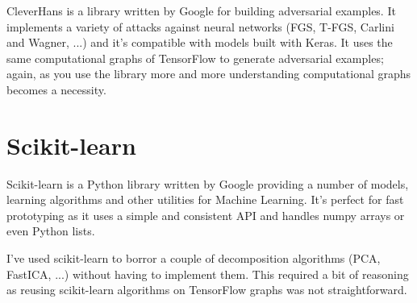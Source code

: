 CleverHans is a library written by Google for building adversarial examples. It
implements a variety of attacks against neural networks (FGS, T-FGS, Carlini and
Wagner, ...) and it's compatible with models built with Keras. It uses the same
computational graphs of TensorFlow to generate adversarial examples; again, as
you use the library more and more understanding computational graphs becomes a
necessity.

\section{Scikit-learn}
\label{sec:sklearn}

Scikit-learn is a Python library written by Google providing a number of models,
learning algorithms and other utilities for Machine Learning. It's perfect for
fast prototyping as it uses a simple and consistent API and handles numpy arrays
or even Python lists.

I've used scikit-learn to borror a couple of decomposition algorithms (PCA, FastICA, ...)
without having to implement them. This required a bit of reasoning as reusing scikit-learn algorithms on
TensorFlow graphs was not straightforward.
